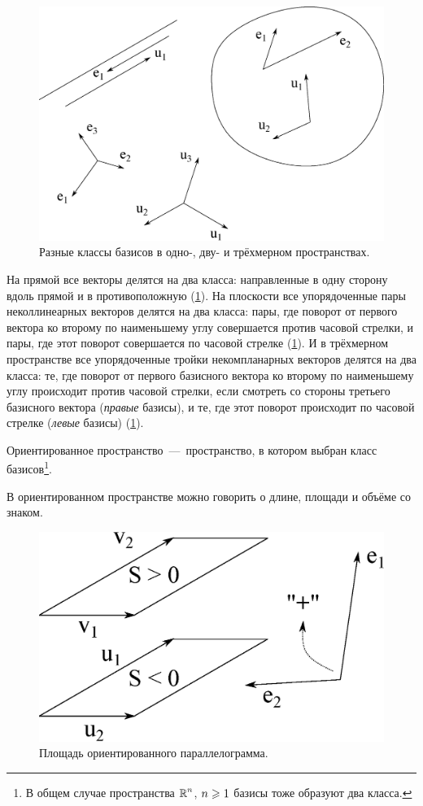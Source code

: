 \documentclass[a4paper,12pt]{article}
\begin{document}
  \begin{figure}[h]
    \centering
    
    \includegraphics[width=0.8\columnwidth]{two-classes}
    
    \caption{Разные классы базисов в одно-, дву- и трёхмерном пространствах.}
    \label{fig:two-classes}
  \end{figure}
  
  На прямой все векторы делятся на два класса: направленные в одну сторону вдоль прямой и в противоположную (\ref{fig:two-classes}).
  На плоскости все упорядоченные пары неколлинеарных векторов делятся на два класса: пары, где поворот от первого вектора ко второму по наименьшему углу совершается против часовой стрелки, и пары, где этот поворот совершается по часовой стрелке (\ref{fig:two-classes}).
  И в трёхмерном пространстве все упорядоченные тройки некомпланарных векторов делятся на два класса: те, где поворот от первого базисного вектора ко второму по наименьшему углу происходит против часовой стрелки, если смотреть со стороны третьего базисного вектора (\emph{правые} базисы), и те, где этот поворот происходит по часовой стрелке (\emph{левые} базисы) (\ref{fig:two-classes}).
  
  \begin{definition}
    Ориентированное пространство~---~пространство, в котором выбран класс базисов\footnote{В общем случае пространства $\operatorname{\mathbb R}^n$, $n \hm\geq 1$ базисы тоже образуют два класса.}.
  \end{definition}
  
  В ориентированном пространстве можно говорить о длине, площади и объёме со знаком.
  
  \begin{figure}[h]
    \centering
    
    \includegraphics[width=0.5\columnwidth]{two-parallelograms}
    
    \caption{Площадь ориентированного параллелограмма.}
    \label{fig:two-parallelograms}
  \end{figure}
  
\end{document}
